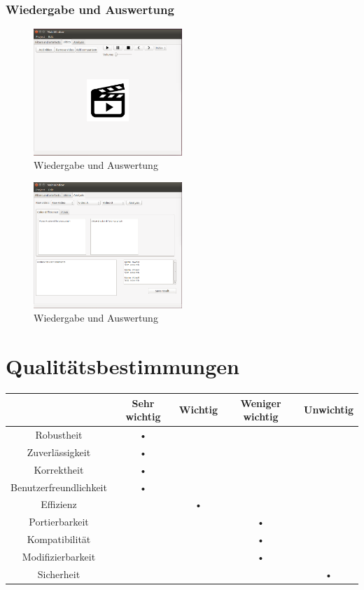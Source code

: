 \documentclass[parskip=full]{scrartcl}
\begin{document}
\subsubsection{Wiedergabe und Auswertung}
\begin{figure}[htbp]
\centering
\includegraphics[width=0.5\textwidth]{ToViET/Screenshots/MainWindow_3.png}
\caption{Wiedergabe und Auswertung}
\end{figure}
\begin{figure}[htbp]
\centering
\includegraphics[width=0.5\textwidth]{ToViET/Screenshots/MainWindow_4.png}
\caption{Wiedergabe und Auswertung}
\end{figure}
\newpage
\section{Qualitätsbestimmungen}
\begin{tabular}{|c|c|c|c|c|}
\hline & Sehr wichtig & Wichtig & Weniger wichtig & Unwichtig \\
\hline Robustheit & • &  &  & \\ 
\hline Zuverlässigkeit & • &  &  & \\ 
\hline Korrektheit & • &  &  & \\ 
\hline Benutzerfreundlichkeit & • &  &  & \\ 
\hline Effizienz &  & • &  & \\ 
\hline Portierbarkeit &  &  & • & \\ 
\hline Kompatibilität &  &  & • & \\ 
\hline Modifizierbarkeit &  &  & • & \\ 
\hline Sicherheit &  &  &  & • \\ 
\hline 
\end{tabular} 
\newpage
\end{document}
